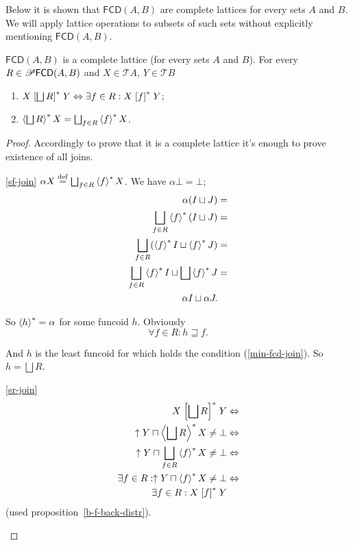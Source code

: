 Below it is shown that $\mathsf{FCD}(A,B)$ are complete lattices
for every sets $A$ and $B$. We will apply lattice operations to
subsets of such sets without explicitly mentioning $\mathsf{FCD}(A,B)$.
\begin{thm}
\label{fcd-join-sets}$\mathsf{FCD}(A,B)$ is a complete lattice (for
every sets $A$ and $B$). For every $R\in\mathscr{P}\mathsf{FCD}(A,B)$
and $X\in\mathscr{T}A$, $Y\in\mathscr{T}B$
\begin{enumerate}
\item \label{sr-join}$X\rsuprel{\bigsqcup R}Y\Leftrightarrow\exists f\in
R:X\rsuprel fY$;
\item \label{sf-join}$\rsupfun{\bigsqcup R}X=\bigsqcup_{f\in R}\rsupfun fX$.
\end{enumerate}
\end{thm}
\begin{proof}
Accordingly \cite{pm:complete-lattice-criteria} to prove that it
is a complete lattice it's enough to prove existence of all joins.
\begin{widedisorder}
\item [{\ref{sf-join}}] $\alpha X\eqdef\bigsqcup_{f\in R}\rsupfun fX$.
We have $\alpha\bot=\bot$;
\begin{align*}
\alpha(I\sqcup J) & =\\
\bigsqcup_{f\in R}\rsupfun f(I\sqcup J) & =\\
\bigsqcup_{f\in R}(\rsupfun fI\sqcup\rsupfun fJ) & =\\
\bigsqcup_{f\in R}\rsupfun fI\sqcup\bigsqcup\rsupfun fJ & =\\
\alpha I\sqcup\alpha J.
\end{align*}



So $\left\langle h\right\rangle ^{\ast}=\alpha$ for some funcoid $h$. Obviously
\begin{equation}
\forall f\in R:h\sqsupseteq f.\label{min-fcd-join}
\end{equation}



And $h$ is the least funcoid for which holds the condition (\ref{min-fcd-join}).
So $h=\bigsqcup R$.

\item [{\ref{sr-join}}] ~
\begin{align*}
X\rsuprel{\bigsqcup R}Y & \Leftrightarrow\\
\uparrow Y\sqcap\rsupfun{\bigsqcup R}X\ne\bot &
\Leftrightarrow\\
\uparrow Y\sqcap\bigsqcup_{f\in R}\rsupfun fX\ne\bot &
\Leftrightarrow\\
\exists f\in R:\uparrow Y\sqcap\rsupfun fX\ne\bot &
\Leftrightarrow\\
\exists f\in R:X\rsuprel fY
\end{align*}
(used proposition~\ref{b-f-back-distr}).
\end{widedisorder}
\end{proof}
